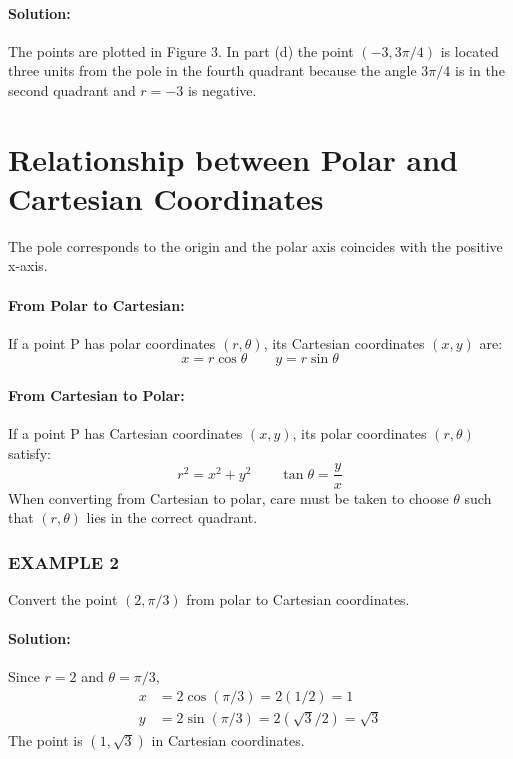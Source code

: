 \documentclass{article}
\begin{document}
\paragraph{Solution:} The points are plotted in Figure 3. In part (d) the point $(-3, 3\pi/4)$ is located three units from the pole in the fourth quadrant because the angle $3\pi/4$ is in the second quadrant and $r=-3$ is negative.

\section*{Relationship between Polar and Cartesian Coordinates}
The pole corresponds to the origin and the polar axis coincides with the positive x-axis.

\paragraph{From Polar to Cartesian:} If a point P has polar coordinates $(r, \theta)$, its Cartesian coordinates $(x,y)$ are:
\[ x = r\cos\theta \qquad y = r\sin\theta \]

\paragraph{From Cartesian to Polar:} If a point P has Cartesian coordinates $(x,y)$, its polar coordinates $(r, \theta)$ satisfy:
\[ r^2 = x^2 + y^2 \qquad \tan\theta = \frac{y}{x} \]
When converting from Cartesian to polar, care must be taken to choose $\theta$ such that $(r, \theta)$ lies in the correct quadrant.

\subsubsection*{EXAMPLE 2}
Convert the point $(2, \pi/3)$ from polar to Cartesian coordinates.

\paragraph{Solution:} Since $r=2$ and $\theta=\pi/3$,
\begin{align*}
    x &= 2\cos(\pi/3) = 2(1/2) = 1 \\
    y &= 2\sin(\pi/3) = 2(\sqrt{3}/2) = \sqrt{3}
\end{align*}
The point is $(1, \sqrt{3})$ in Cartesian coordinates.
\end{document}
